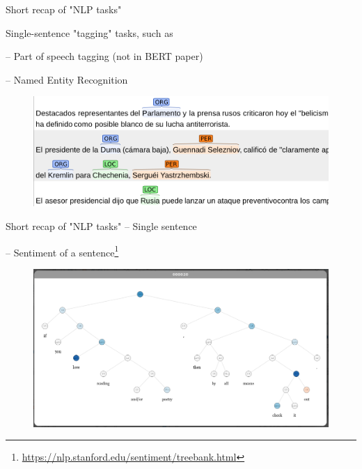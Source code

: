 \documentclass[12pt]{beamer}
\begin{document}
\begin{frame}{Short recap of "NLP tasks"}

Single-sentence "tagging" tasks, such as

-- Part of speech tagging (not in BERT paper)

-- Named Entity Recognition

\begin{figure}
	\includegraphics[width=0.7\linewidth]{img/ner.png}
\end{figure}


	
\end{frame}

\begin{frame}{Short recap of "NLP tasks" -- Single sentence}
	
-- Sentiment of a sentence\footnote{\url{https://nlp.stanford.edu/sentiment/treebank.html}}
	
\begin{figure}
	\includegraphics[width=0.95\linewidth]{img/sentiment.png}
\end{figure}

	
\end{frame}
\end{document}
